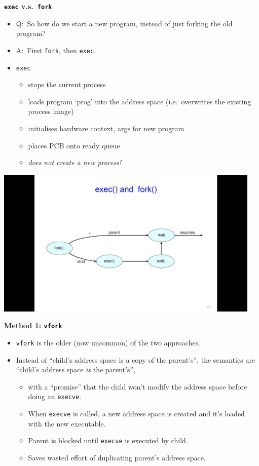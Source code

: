 \documentclass[11pt,a4paper]{article}
\begin{document}
\textbf{\texttt{exec} v.s.\ \texttt{fork}}
\begin{itemize}
    \item Q:\ So how do we start a new program, instead of just forking the old program?
    \item A:\ First \texttt{fork}, then \texttt{exec}.
    \item \texttt{exec}
        \begin{itemize}
            \item stops the current process
            \item loads program `prog' into the address space
                (i.e.\ overwrites the existing process image)
            \item initialises hardware context, args for new program
            \item places PCB onto ready queue
            \item \emph{does not create a new process!}
        \end{itemize}
\end{itemize}

\includegraphics[height=270]{exec-and-fork.jpg}

\textbf{Method 1: \texttt{vfork}}
\begin{itemize}
    \item \texttt{vfork} is the older (now uncommon) of the two approaches.
    \item Instead of ``child's address space is a copy of the parent's'',
        the semantics are ``child's address space \emph{is} the parent's'',
        \begin{itemize}
            \item with a ``promise'' that the child won't modify the address space before doing
                an \texttt{execve}.
            \item When \texttt{execve} is called, a new address space is created and it's
                loaded with the new executable.
            \item Parent is blocked until \texttt{execve} is executed by child.
            \item Saves wasted effort of duplicating parent's address space.
        \end{itemize}
\end{itemize}
\end{document}
